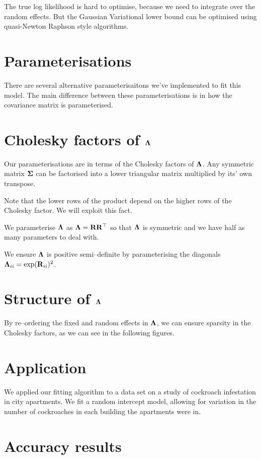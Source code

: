 \documentclass{amsart}
\begin{document}
The true log likelihood is hard to optimise, because we need to integrate over the random effects. But the
Gaussian Variational lower bound can be optimised using quasi-Newton Raphson style algorithms.

\section{Parameterisations}

There are several alternative parameterisaitons we've implemented to fit this model. The main difference between
these parameterisations is in how the covariance matrix is parameterised.

\section{Cholesky factors of ${\boldsymbol \Lambda}$}

Our parameterisations are in terms of the Cholesky factors of ${\boldsymbol \Lambda}$. Any symmetric matrix ${\boldsymbol \Sigma}$
can be factorised into a lower triangular matrix multiplied by its' own transpose.

Note that the lower rows of the product depend on the higher rows of the Cholesky factor. We will exploit this
fact.

We parameterise ${\boldsymbol \Lambda}$ as ${\boldsymbol \Lambda} = {\bf R} {\bf R}^\top$ so that ${\boldsymbol \Lambda}$ is symmetric and we have half as
many parameters to deal with.

We ensure ${\boldsymbol \Lambda}$ is positive semi--definite by parameterising the diagonals
${\boldsymbol \Lambda}_{ii} = \exp({\bf R}_{ii})^2$.

\section{Structure of ${\boldsymbol \Lambda}$}

By re--ordering the fixed and random effects in ${\boldsymbol \Lambda}$, we can ensure sparsity in the Cholesky factors,
as we can see in the following figures.

\section{Application}

We applied our fitting algorithm to a data set on a study of cockroach infestation in city apartments. We fit
a random intercept model, allowing for variation in the number of cockroaches in each building the apartments
were in.

\section{Accuracy results}
\end{document}
